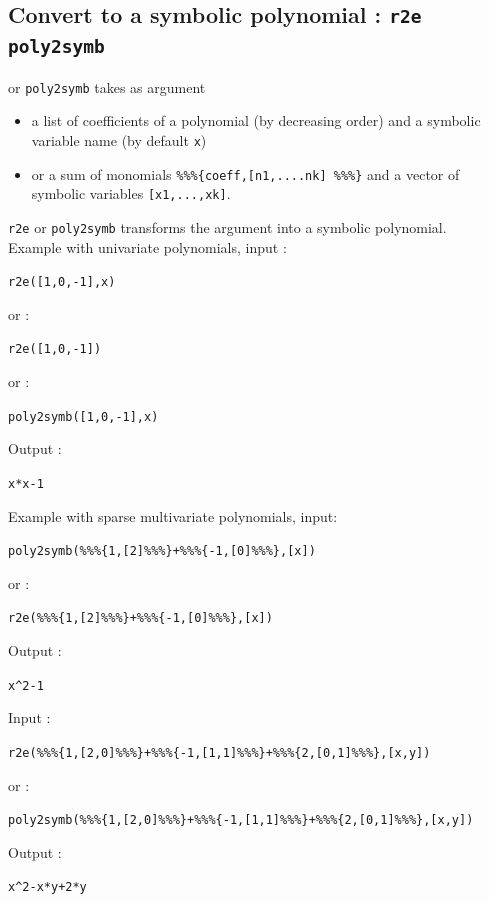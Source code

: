 \documentclass[a4paper,11pt]{book}
\begin{document}
\subsection{Convert to a symbolic polynomial : {\tt r2e poly2symb}}
 or  {\tt poly2symb} takes as argument 
\begin{itemize}
\item a list of 
coefficients of a polynomial (by decreasing order) and a symbolic
variable name 
(by default {\tt x})
\item or a sum of monomials {\tt \%\%\%\{coeff,[n1,....nk] \%\%\%\}} 
and a vector of symbolic variables {\tt [x1,...,xk]}.
\end{itemize}
{\tt r2e} or  {\tt poly2symb} transforms the argument into a symbolic
polynomial.\\
Example with univariate polynomials, input :
\begin{center}{\tt r2e([1,0,-1],x)}\end{center}
or :
\begin{center}{\tt r2e([1,0,-1])}\end{center}
or :
\begin{center}{\tt poly2symb([1,0,-1],x)}\end{center}
Output :
\begin{center}{\tt  x*x-1}\end{center}
Example with sparse multivariate polynomials, input:
\begin{center}{\tt poly2symb(\%\%\%\{1,[2]\%\%\%\}+\%\%\%\{-1,[0]\%\%\%\},[x])}\end{center}
or :
\begin{center}{\tt r2e(\%\%\%\{1,[2]\%\%\%\}+\%\%\%\{-1,[0]\%\%\%\},[x])}\end{center}
Output :
\begin{center}{\tt  x\verb|^2|-1}\end{center}
Input :
\begin{center}{\tt r2e(\%\%\%\{1,[2,0]\%\%\%\}+\%\%\%\{-1,[1,1]\%\%\%\}+\%\%\%\{2,[0,1]\%\%\%\},[x,y])}\end{center}
or :
\begin{center}{\tt poly2symb(\%\%\%\{1,[2,0]\%\%\%\}+\%\%\%\{-1,[1,1]\%\%\%\}+\%\%\%\{2,[0,1]\%\%\%\},[x,y])}\end{center}
Output :
\begin{center}{\tt  x\verb|^|2-x*y+2*y}\end{center}
\end{document}
